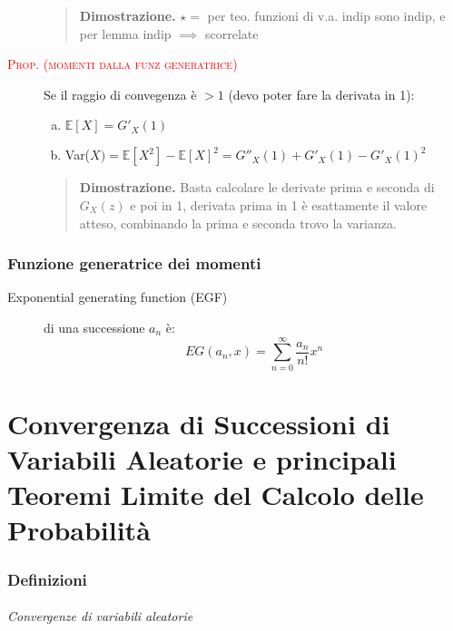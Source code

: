 \documentclass[a4paper,10pt]{article}
\newcommand{\myth}{\normalfont \scshape \textcolor{red}} %
\newcommand{\ex}{\mathbb{E}} %
\theoremstyle{remark}
\theoremstyle{definition}
\newenvironment{dimo}{\begin{quote}\textbf{Dimostrazione.}}{\end{quote}} %
\begin{document}
\begin{description}
\begin{dimo}
  $\star =$ per teo. funzioni di v.a.  indip sono indip, e per lemma indip $\implies$ scorrelate
\end{dimo}

\item[\myth{Prop. (momenti dalla funz generatrice)}] Se il raggio di convegenza è $>1$ (devo poter fare la derivata in 1):
\begin{enumerate}[(a)]
    \item $\ex[X]= G'_X(1)$
    \item Var($X) = \ex[X^2]- \ex[X]^2=  G''_X(1) +G'_X(1) - G'_X(1)^2 $
\end{enumerate}

\begin{dimo}
Basta calcolare le derivate prima e seconda di $G_X(z)$ e poi in 1, derivata prima in 1 è esattamente il valore atteso, combinando la prima e seconda  trovo la varianza.
\end{dimo}

\end{description}

\section*{Funzione generatrice dei momenti}
\begin{description}
   \item[Exponential generating function (EGF)] di una successione $a_n$ è: $$EG(a_n,x)=\sum_{n=0}^\infty \frac{a_n}{n!}x^n$$
\end{description}






\part{Convergenza di Successioni di Variabili Aleatorie e principali Teoremi
Limite del Calcolo delle Probabilità}

\section*{Definizioni}

\paragraph*{Convergenze di variabili aleatorie }
\end{document}
